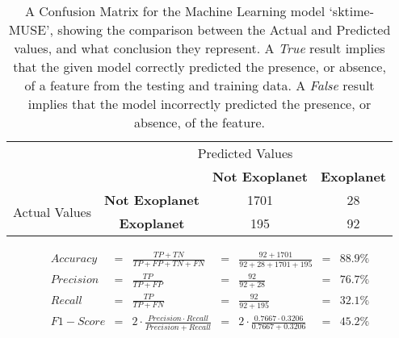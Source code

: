 
    \renewcommand{\arraystretch}{2}
    \renewcommand{\tabcolsep}{20.25pt}
    \vspace{-0.5cm}
    \begin{table}[ht]
    \begin{tabular}{cccc}
     & \multicolumn{3}{c}{Predicted Values} \\ \cline{3-4}
     & \multicolumn{1}{c|}{} & \multicolumn{1}{c|}{\textbf{Not Exoplanet}} & \multicolumn{1}{c|}{\textbf{Exoplanet}} \\ \cline{2-4}
    \multicolumn{1}{c|}{\multirow{2}{2.0cm}{Actual Values}} & \multicolumn{1}{c|}{\textbf{Not Exoplanet}} & \multicolumn{1}{c|}{1701} & \multicolumn{1}{c|}{28} \\ \cline{2-4}
    \multicolumn{1}{c|}{} & \multicolumn{1}{c|}{\textbf{Exoplanet}} & \multicolumn{1}{c|}{195} & \multicolumn{1}{c|}{92} \\ \cline{2-4}
    \end{tabular}
    \caption{A Confusion Matrix for the Machine Learning model `sktime-MUSE', showing the comparison between the Actual and Predicted values, and what conclusion they represent. A \emph{True} result implies that the given model correctly predicted the presence, or absence, of a feature from the testing and training data. A \emph{False} result implies that the model incorrectly predicted the presence, or absence, of the feature.}
    \label{tab:sktime-MUSEconfusionmatrix}
    \end{table}
    \vspace{-0.75cm}
    \label{eq:metrics-sktime-MUSE}
    \begin{align*}
        Accuracy &= &\frac{TP + TN}{TP + FP + TN + FN} &= &\frac{92 + 1701}{92 + 28 + 1701 + 195} &= & 88.9\% \\
        Precision &= &\frac{TP}{TP + FP} &= &\frac{92}{92 + 28} &= & 76.7\% \\
        Recall &= &\frac{TP}{TP + FN} &= &\frac{92}{92 + 195} &= & 32.1\% \\
        F1-Score &= &2 \cdot \frac{Precision \cdot Recall}{Precision + Recall} &= &2 \cdot \frac{0.7667 \cdot 0.3206}{0.7667 + 0.3206} &= & 45.2\% \\
    \end{align*}
    \vspace{-1.75cm}
    \renewcommand{\arraystretch}{1}
    \renewcommand{\tabcolsep}{5.25pt}
    